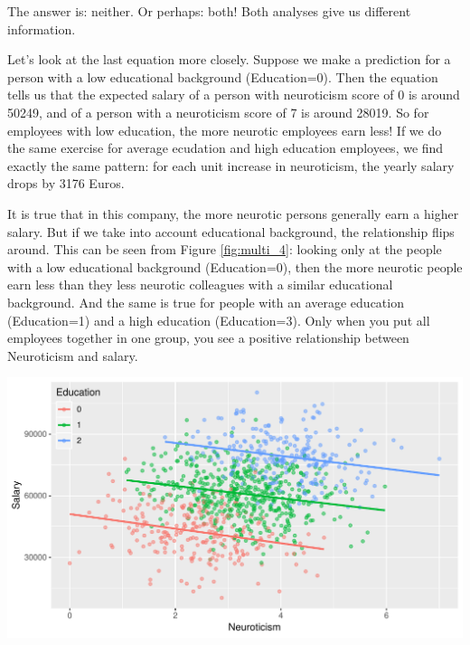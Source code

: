 \documentclass[]{book}\usepackage[]{graphicx}\usepackage[]{color}
\makeatletter
\def\maxwidth{ %
  \ifdim\Gin@nat@width>\linewidth
    \linewidth
  \else
    \Gin@nat@width
  \fi
}
\newenvironment{knitrout}{}{} %
\makeatother
\begin{document}
The answer is: neither. Or perhaps: both! Both analyses give us different information.

Let's look at the last equation more closely. Suppose we make a prediction for a person with a low educational background (Education=0). Then the equation tells us that the expected salary of a person with neuroticism score of 0 is around 50249, and of a person with a neuroticism score of 7 is around 28019. So for employees with low education, the more neurotic employees earn less! If we do the same exercise for average ecudation and high education employees, we find exactly the same pattern: for each unit increase in neuroticism, the yearly salary drops by 3176 Euros.


It is true that in this company, the more neurotic persons generally earn a higher salary. But if we take into account educational background, the relationship flips around. This can be seen from Figure \ref{fig:multi_4}: looking only at the people with a low educational background (Education=0), then the more neurotic people earn less than they less neurotic colleagues with a similar educational background. And the same is true for people with an average education (Education=1) and a high education (Education=3). Only when you put all employees together in one group, you see a positive relationship between Neuroticism and salary.


\begin{knitrout}
\color{fgcolor}

{\centering \includegraphics[width=\maxwidth]{figure/multi_5-1} 

}



\end{knitrout}
\end{document}
